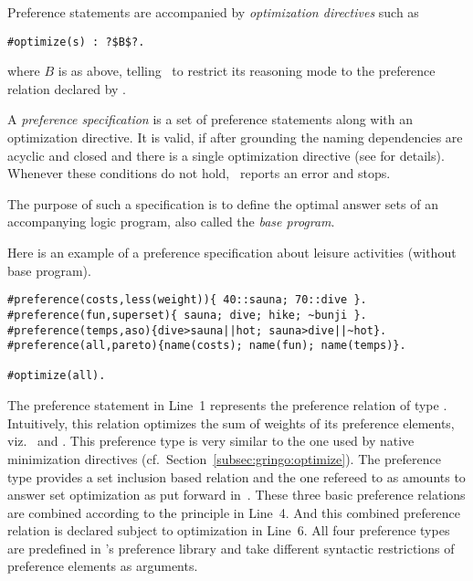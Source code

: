 Preference statements are accompanied by 
\emph{optimization directives} such as
\begin{lstlisting}[numbers=none,escapechar=?]
#optimize(s) : ?$B$?.
\end{lstlisting}
where $B$ is as above, 
telling \asprin\ to restrict its reasoning mode to the preference relation declared by .
% 

A \emph{preference specification} is a set of preference statements along with an optimization directive.
It is valid, if after grounding the naming dependencies are acyclic and closed
and there is a single optimization directive
(see \cite{brderosc15a} for details).
Whenever these conditions do not hold, \asprin\ reports an error and stops.

The purpose of such a specification is to define the optimal answer sets of an accompanying logic program,
also called the \emph{base program}.

Here is an example of a {preference specification} about leisure activities (without base program).
\begin{lstlisting}[escapechar=?]
#preference(costs,less(weight)){ 40::sauna; 70::dive }.
#preference(fun,superset){ sauna; dive; hike; ~bunji }.
#preference(temps,aso){dive>sauna||hot; sauna>dive||~hot}.
#preference(all,pareto){name(costs); name(fun); name(temps)}.

#optimize(all).
\end{lstlisting}
The preference statement in Line~1 represents the preference relation  of type .
Intuitively, this relation optimizes the sum of weights of its preference elements, 
viz.\  and .
This preference type is very similar to the one used by native minimization directives (cf.\ Section~\ref{subsec:gringo:optimize}).
The preference type  provides a set inclusion based relation and the one refereed to as 
amounts to answer set optimization as put forward in~\cite{brnitr03a}.
These three basic preference relations are combined according to the  principle in Line~4.
And this combined preference relation is declared subject to optimization in Line~6.
%
All four preference types are predefined in \asprin's preference library and take different syntactic restrictions of preference elements as arguments.
